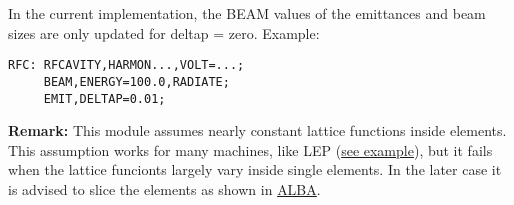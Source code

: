 In the current implementation, the BEAM values of the emittances and beam sizes are only updated for deltap = zero. 
Example: 
\begin{verbatim}
RFC: RFCAVITY,HARMON...,VOLT=...;
     BEAM,ENERGY=100.0,RADIATE;
     EMIT,DELTAP=0.01;
\end{verbatim}
\textbf{Remark:}  This module assumes nearly constant lattice functions inside elements. This assumption works for many machines,  like LEP (\href{http://cern.ch/frs/mad-X_examples/emit/LEP/}{see example}), but it fails when the lattice funcionts largely vary inside single elements. In the later case it is advised to slice the elements as shown in     \href{http://cern.ch/frs/mad-X_examples/emit/ALBA/}{ALBA}.   


